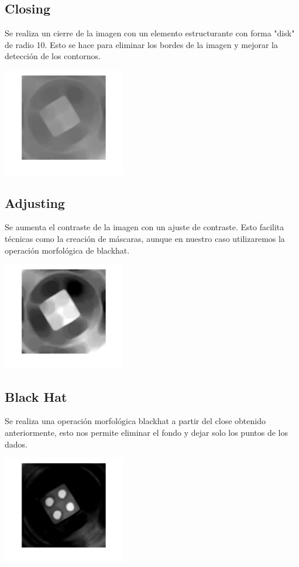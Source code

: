 \subsection{Closing}
Se realiza un cierre de la imagen con un elemento estructurante con forma "disk" de radio 10. Esto se hace para eliminar los bordes de la imagen y mejorar la detección de los contornos.
\begin{center}
    \includegraphics[width=0.4\textwidth]{ImagenesLatex/dice_close.jpg}
\end{center}

\newpage
\subsection{Adjusting}
Se aumenta el contraste de la imagen con un ajuste de contraste. Esto facilita técnicas como la creación de máscaras, aunque en nuestro caso utilizaremos la operación morfológica de blackhat.
\begin{center}
    \includegraphics[width=0.4\textwidth]{ImagenesLatex/dice_adjust.jpg}
\end{center}

\subsection{Black Hat}
Se realiza una operación morfológica blackhat a partir del close obtenido anteriormente, esto nos permite eliminar el fondo y dejar solo los puntos de los dados.
\begin{center}
    \includegraphics[width=0.4\textwidth]{ImagenesLatex/blackhat.jpg}
\end{center}


